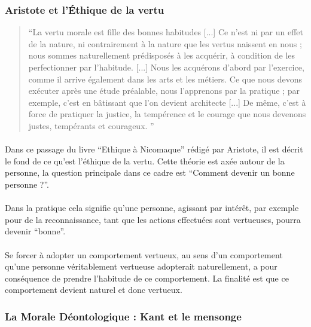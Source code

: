 \documentclass[10pt, french, a4paper]{report}
\begin{document}
\subsubsection{Aristote et l'\uppercase{é}thique de la vertu}

\begin{quotation}
  ``La vertu morale est fille des bonnes habitudes [...] Ce n'est ni par un effet de la nature, ni contrairement à la nature que les vertus naissent en nous ; nous sommes naturellement prédisposés à les acquérir, à condition de les perfectionner par l'habitude. [...] Nous les acquérons d'abord par l'exercice, comme il arrive également dans les arts et les métiers. Ce que nous devons exécuter après une étude préalable, nous l'apprenons par la pratique ; par exemple, c'est en bâtissant que l'on devient architecte [...] De même, c'est à force de pratiquer la justice, la tempérence et le courage que nous devenons justes, tempérants et courageux. ''
\end{quotation}

\paragraph{}
Dans ce passage du livre ``Ethique à Nicomaque'' rédigé par Aristote, il est décrit le fond de ce qu'est l'éthique de la vertu. Cette théorie est axée autour de la personne, la question principale dans ce cadre est ``Comment devenir un bonne personne ?''.

\paragraph{}
Dans la pratique cela signifie qu'une personne, agissant par intérêt, par exemple pour de la reconnaissance, tant que les actions effectuées sont vertueuses, pourra devenir ``bonne''. 

\paragraph{}
Se forcer à adopter un comportement vertueux, au sens d'un comportement qu'une personne véritablement vertueuse adopterait naturellement, a pour conséquence de prendre l'habitude de ce comportement. La finalité est que ce comportement devient naturel et donc vertueux.

\subsubsection{La Morale Déontologique : Kant et le mensonge}
\end{document}
